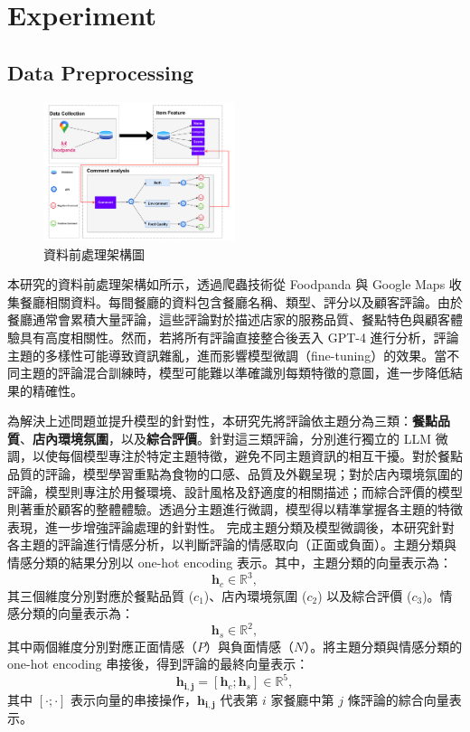\section{Experiment}
    \subsection{Data Preprocessing}
        \begin{figure}[tbh]
            \centering
            \includegraphics[width=0.5\textwidth]{img/preprocess.pdf}
            \caption{資料前處理架構圖}
            \label{fig-preprocess}
        \end{figure}
        本研究的資料前處理架構如所示，透過爬蟲技術從 Foodpanda 與 Google Maps 收集餐廳相關資料。每間餐廳的資料包含餐廳名稱、類型、評分以及顧客評論。由於餐廳通常會累積大量評論，這些評論對於描述店家的服務品質、餐點特色與顧客體驗具有高度相關性。然而，若將所有評論直接整合後丟入 GPT-4 進行分析，評論主題的多樣性可能導致資訊雜亂，進而影響模型微調（fine-tuning）的效果。當不同主題的評論混合訓練時，模型可能難以準確識別每類特徵的意圖，進一步降低結果的精確性。

        為解決上述問題並提升模型的針對性，本研究先將評論依主題分為三類：\textbf{餐點品質}、\textbf{店內環境氛圍}，以及\textbf{綜合評價}。針對這三類評論，分別進行獨立的 LLM 微調，以使每個模型專注於特定主題特徵，避免不同主題資訊的相互干擾。對於餐點品質的評論，模型學習重點為食物的口感、品質及外觀呈現；對於店內環境氛圍的評論，模型則專注於用餐環境、設計風格及舒適度的相關描述；而綜合評價的模型則著重於顧客的整體體驗。透過分主題進行微調，模型得以精準掌握各主題的特徵表現，進一步增強評論處理的針對性。\color{blue}
        完成主題分類及模型微調後，本研究針對各主題的評論進行情感分析，以判斷評論的情感取向（正面或負面）。主題分類與情感分類的結果分別以 one-hot encoding 表示。其中，主題分類的向量表示為：
        \begin{equation}
            \mathbf{h}_c \in \mathbb{R}^3,
        \end{equation}
        其三個維度分別對應於餐點品質 (\(c_1\))、店內環境氛圍 (\(c_2\)) 以及綜合評價 (\(c_3\))。情感分類的向量表示為：
        \begin{equation}
            \mathbf{h}_s \in \mathbb{R}^2,
        \end{equation}
        其中兩個維度分別對應正面情感（\(P\)）與負面情感（\(N\)）。將主題分類與情感分類的 one-hot encoding 串接後，得到評論的最終向量表示：
        \begin{equation}
            \mathbf{h_{i,j}} = [\mathbf{h}_c; \mathbf{h}_s] \in \mathbb{R}^5,
        \end{equation}
        其中 \([\cdot; \cdot]\) 表示向量的串接操作，\(\mathbf{h_{i,j}}\) 代表第 \(i\) 家餐廳中第 \(j\) 條評論的綜合向量表示。
        
